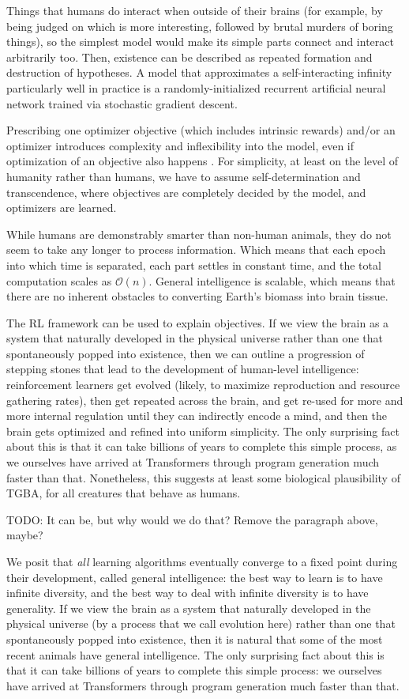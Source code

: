 \documentclass{article}
\begin{document}
Things that humans do interact when outside of their brains (for example, by being judged on which is more interesting, followed by brutal murders of boring things), so the simplest model would make its simple parts connect and interact arbitrarily too. Then, existence can be described as repeated formation and destruction of hypotheses. A model that approximates a self-interacting infinity particularly well in practice is a randomly-initialized recurrent artificial neural network trained via stochastic gradient descent.

Prescribing one optimizer objective (which includes intrinsic rewards) and/or an optimizer introduces complexity and inflexibility into the model, even if optimization of an objective also happens \cite{Dabney2020}. For simplicity, at least on the level of humanity rather than humans, we have to assume self-determination and transcendence, where objectives are completely decided by the model, and optimizers are learned.

While humans are demonstrably smarter than non-human animals, they do not seem to take any longer to process information. Which means that each epoch into which time is separated, each part settles in constant time, and the total computation scales as $\mathcal{O}(n)$. General intelligence is scalable, which means that there are no inherent obstacles to converting Earth's biomass into brain tissue.

The RL framework can be used to explain objectives. If we view the brain as a system that naturally developed in the physical universe rather than one that spontaneously popped into existence, then we can outline a progression of stepping stones that lead to the development of human-level intelligence: reinforcement learners get evolved (likely, to maximize reproduction and resource gathering rates), then get repeated across the brain, and get re-used for more and more internal regulation until they can indirectly encode a mind, and then the brain gets optimized and refined into uniform simplicity. The only surprising fact about this is that it can take billions of years to complete this simple process, as we ourselves have arrived at Transformers through program generation much faster than that. Nonetheless, this suggests at least some biological plausibility of TGBA, for all creatures that behave as humans.

    TODO: It can be, but why would we do that? Remove the paragraph above, maybe?

We posit that \textit{all} learning algorithms eventually converge to a fixed point during their development, called general intelligence: the best way to learn is to have infinite diversity, and the best way to deal with infinite diversity is to have generality. If we view the brain as a system that naturally developed in the physical universe (by a process that we call evolution here) rather than one that spontaneously popped into existence, then it is natural that some of the most recent animals have general intelligence. The only surprising fact about this is that it can take billions of years to complete this simple process: we ourselves have arrived at Transformers through program generation much faster than that.
\end{document}
